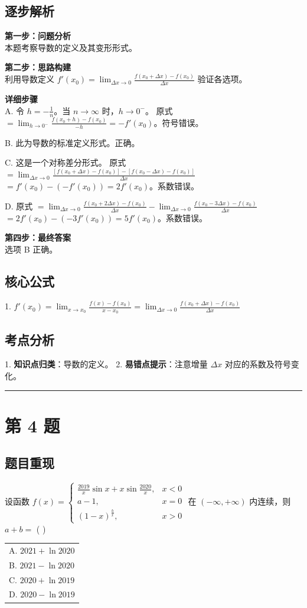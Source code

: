 \documentclass[10pt, a4paper]{ctexart}
\newcommand{\problemheader}{
    \vspace{0.5cm}
    \noindent\rule[0.5ex]{\linewidth}{2pt} %
}
\newcommand{\analysisheader}{
    \vspace{0.2cm}
    \noindent{\color{red}\rule[0.5ex]{\linewidth}{0.5pt}} %
    \vspace{0.1cm}
}
\begin{document}
\analysisheader
{\color{red}
\subsection*{逐步解析}
\textbf{第一步：问题分析} \\
本题考察导数的定义及其变形形式。

\textbf{第二步：思路构建} \\
利用导数定义 $f'(x_0) = \lim_{\Delta x \to 0} \frac{f(x_0+\Delta x) - f(x_0)}{\Delta x}$ 验证各选项。

\textbf{详细步骤} \\
A. 令 $h = -\frac{1}{n}$。当 $n \to \infty$ 时，$h \to 0^-$。
原式 $= \lim_{h \to 0^-} \frac{f(x_0 + h) - f(x_0)}{-h} = -f'(x_0)$。符号错误。

B. 此为导数的标准定义形式。正确。

C. 这是一个对称差分形式。
原式 $= \lim_{\Delta x \to 0} \frac{[f(x_0+\Delta x) - f(x_0)] - [f(x_0-\Delta x) - f(x_0)]}{\Delta x}$
$= f'(x_0) - (-f'(x_0)) = 2f'(x_0)$。系数错误。

D. 原式 $= \lim_{\Delta x \to 0} \frac{f(x_0+2\Delta x) - f(x_0)}{\Delta x} - \lim_{\Delta x \to 0} \frac{f(x_0-3\Delta x) - f(x_0)}{\Delta x}$
$= 2f'(x_0) - (-3f'(x_0)) = 5f'(x_0)$。系数错误。

\textbf{第四步：最终答案} \\
选项 B 正确。

\subsection*{核心公式}
1. $f'(x_0) = \lim_{x \to x_0} \frac{f(x) - f(x_0)}{x - x_0} = \lim_{\Delta x \to 0} \frac{f(x_0+\Delta x) - f(x_0)}{\Delta x}$

\subsection*{考点分析}
1. \textbf{知识点归类}：导数的定义。
2. \textbf{易错点提示}：注意增量 $\Delta x$ 对应的系数及符号变化。
}

\problemheader
\section*{第 4 题}
\subsection*{题目重现}
设函数 
$f(x) = \begin{cases} 
\frac{2019}{x} \sin x + x \sin \frac{2020}{x}, & x < 0 \\
a - 1, & x = 0 \\
(1 - x)^{\frac{b}{x}}, & x > 0
\end{cases}$ 
在 $(-\infty, +\infty)$ 内连续，则 $a+b = $ ( \quad ) \\
\begin{tabularx}{\linewidth}{@{} *{1}{X} @{}}
    A. $2021 + \ln 2020$ \\
    B. $2021 - \ln 2020$ \\
    C. $2020 + \ln 2019$ \\
    D. $2020 - \ln 2019$
\end{tabularx}
\end{document}
